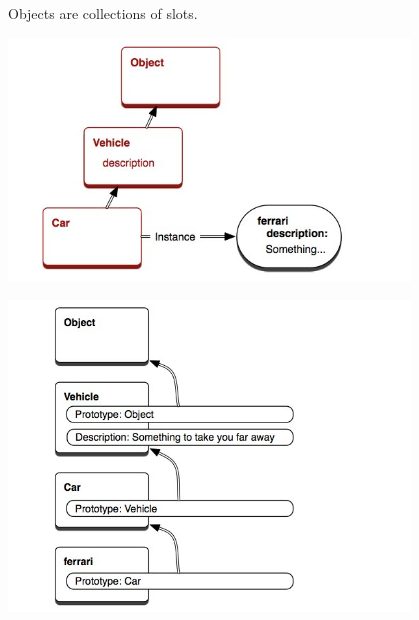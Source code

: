 \begin{frame}
  \begin{center}
    Objects are collections of slots.
  \end{center}
\end{frame}  
  
\begin{frame}
  \begin{center}
    \includegraphics[width=0.8\textwidth]{images/class-based-object-model.jpg}
  \end{center}
\end{frame}

\begin{frame}
  \begin{center}
    \includegraphics[width=0.8\textwidth]{images/prototype-based-object-model.jpg}
  \end{center}
\end{frame}

